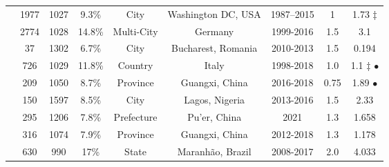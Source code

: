\documentclass[utf8]{FrontiersinHarvard} %
\begin{document}
\begin{table}[h]
\begin{ssmall}
\begin{tabular}{ccccccccc}
		\cite{Gibson:2019aa} & 1977 & 1027 & 9.3\% & City & Washington DC, USA & 1987–2015 & 1 & 1.73 $\ddag$\\
		\cite{Stecher:2018aa} & 2774 & 1028 & 14.8\% & Multi-City & Germany & 1999-2016 & 1.5 & 3.1\\
		\cite{Temereanca:2017aa} & 37 & 1302 & 6.7\% & City & Bucharest, Romania & 2010-2013 & 1.5 & 0.194 \\
		\cite{Fabeni:2020aa} & 726 & 1029 & 11.8\% & Country & Italy & 1998-2018 & 1.0 & 1.1 $\ddag$ $\bullet$ \\
		\cite{Chen:2023aa} & 209 & 1050 & 8.7\% & Province & Guangxi, China & 2016-2018 & 0.75 & 1.89 $\bullet$ \\
		\cite{Billings:2019aa} & 150 & 1597 & 8.5\% & City & Lagos, Nigeria & 2013-2016 & 1.5 & 2.33 \\ 
		\cite{Li:2022aa} & 295 & 1206 & 7.8\%& Prefecture & Pu'er, China & 2021 & 1.3 & 1.658\\
		\cite{Yu:2022aa} & 316 & 1074 & 7.9\% & Province & Guangxi, China & 2012-2018 & 1.3 & 1.178 \\
		\cite{Leal:2020aa} & 630 & 990 & 17\% & State & Maranhão, Brazil & 2008-2017 & 2.0 & 4.033 \\
		\hline
	\end{tabular}
	\end{ssmall}
\end{table}
\end{document}
